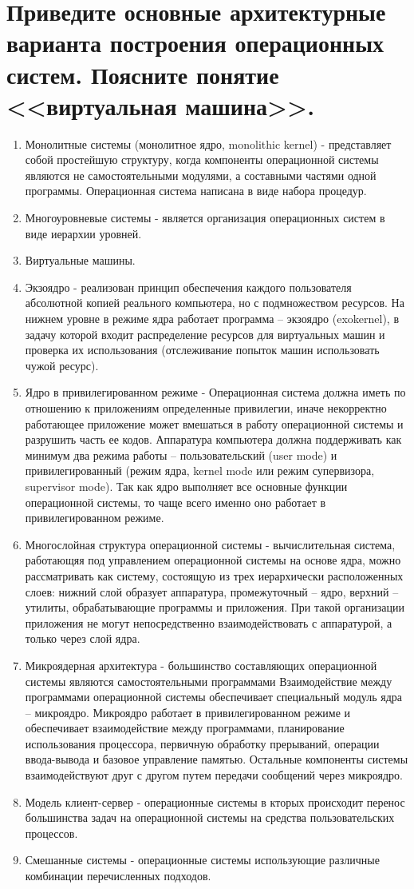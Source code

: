 \documentclass[unicode, 12pt, a4paper, oneside]{article}
\begin{document}
\section{Приведите основные архитектурные варианта построения операционных систем. Поясните понятие <<виртуальная машина>>.}
\begin{enumerate}
\item Монолитные системы (монолитное ядро, monolithic kernel) - представляет собой простейшую структуру, когда компоненты операционной системы являются не самостоятельными модулями, а составными частями одной программы. Операционная система написана в виде набора процедур.
\item Многоуровневые системы - является организация операционных систем в виде иерархии уровней.
\item Виртуальные машины.
\item Экзоядро - реализован принцип обеспечения каждого пользователя абсолютной копией реального компьютера, но с подмножеством ресурсов. На нижнем уровне в режиме ядра работает программа – экзоядро (exokernel), в задачу которой входит распределение ресурсов для виртуальных машин и проверка их использования (отслеживание попыток машин использовать чужой ресурс).
\item Ядро в привилегированном режиме - Операционная система должна иметь по отношению к приложениям определенные привилегии, иначе некорректно работающее приложение может вмешаться в работу операционной системы и разрушить часть ее кодов. Аппаратура компьютера должна поддерживать как минимум два режима работы – пользовательский (user mode) и привилегированный (режим ядра, kernel mode или режим супервизора, supervisor mode). Так как ядро выполняет все основные функции операционной системы, то чаще всего именно оно работает в привилегированном режиме.
\item Многослойная структура операционной системы - вычислительная система, работающяя под управлением операционной системы на основе ядра, можно рассматривать как систему, состоящую из трех иерархически расположенных слоев: нижний слой образует аппаратура, промежуточный – ядро, верхний – утилиты, обрабатывающие программы и приложения. При такой организации приложения не могут непосредственно взаимодействовать с аппаратурой, а только через слой ядра.
\item Микроядерная архитектура  -  большинство составляющих операционной системы являются самостоятельными программами Взаимодействие между программами операционной системы обеспечивает специальный модуль ядра – микроядро. Микроядро работает в привилегированном режиме и обеспечивает взаимодействие между программами, планирование использования процессора, первичную обработку прерываний, операции ввода-вывода и базовое управление памятью. Остальные компоненты системы взаимодействуют друг с другом путем передачи сообщений через микроядро.
\item Модель клиент-сервер - операционные системы в кторых происходит перенос большинства задач на операционной системы на средства пользовательских процессов.
\item Смешанные системы - операционные системы использующие различные комбинации перечисленных подходов.



\end{enumerate}
\end{document}
